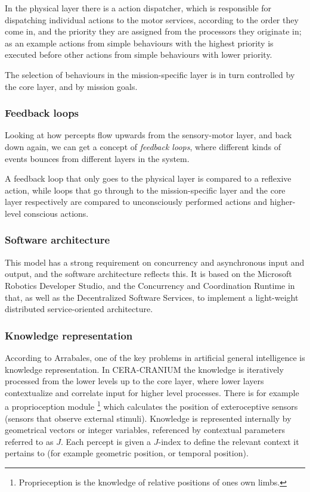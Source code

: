 In the physical layer there is a action dispatcher, which is responsible for
dispatching individual actions to the motor services, according to the order
they come in, and the priority they are assigned from the processors they
originate in; as an example actions from simple behaviours with the highest
priority is executed before other actions from simple behaviours with lower
priority.

The selection of behaviours in the mission-specific layer is in turn controlled
by the core layer, and by mission goals.

\subsubsection{Feedback loops}
Looking at how percepts flow upwards from the sensory-motor layer, and back
down again, we can get a concept of \textit{feedback loops}, where different
kinds of events bounces from different layers in the system.

A feedback loop that only goes to the physical layer is compared to a reflexive
action, while loops that go through to the mission-specific layer and the core
layer respectively are compared to unconsciously performed actions and
higher-level conscious actions.

\subsubsection{Software architecture}
This model has a strong requirement on concurrency and asynchronous input and
output, and the software architecture reflects this. It is based on the
Microsoft Robotics Developer Studio, and the Concurrency and Coordination
Runtime in that, as well as the Decentralized Software Services, to implement a
light-weight distributed service-oriented architecture.

\subsubsection{Knowledge representation}
According to Arrabales\cite{arrabales2009ceracranium}, one of the key problems
in artificial general intelligence is knowledge representation. In CERA-CRANIUM
the knowledge is iteratively processed from the lower levels up to the core
layer, where lower layers contextualize and correlate input for higher level
processes. There is for example a proprioception module \footnote{Proprieception
is the knowledge of relative positions of ones own limbs.} which calculates the
position of exteroceptive sensors (sensors that observe external stimuli).
Knowledge is represented internally by geometrical vectors or integer variables,
referenced by contextual parameters referred to as $J$. Each percept is given a
$J$-index to define the relevant context it pertains to (for example geometric
position, or temporal position).

